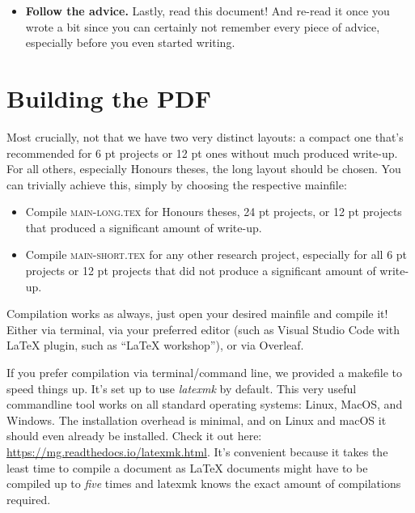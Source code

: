 \begin{itemize}
\begin{itemize}
  \end{itemize}
  Note that in principle, you can even discard this template altogether and choose a standard conference layout, such as those provided by AAAI (google AAAI authorkit) or the ACM (again, google ACM authorkit). This is however only advised for 6 pt projects, and checked with your supervisor. Even if you do switch, follow the next point, i.e., read this template and follow its advice!
  \item \textbf{Follow the advice.} Lastly, read this document! And re-read it once you wrote a bit since you can certainly not remember every piece of advice, especially before you even started writing.
\end{itemize}



\section{Building the PDF}

Most crucially, not that we have two very distinct layouts: a compact one that's recommended for 6 pt projects or 12 pt ones without much produced write-up. For all others, especially Honours theses, the long layout should be chosen. You can trivially achieve this, simply by choosing the respective mainfile:
\begin{itemize}
  \item Compile \textsc{main-long.tex} for Honours theses, 24 pt projects, or 12 pt projects that produced a significant amount of write-up.
  \item Compile \textsc{main-short.tex} for any other research project, especially for all 6 pt projects or 12 pt projects that did not produce a significant amount of write-up.
\end{itemize}

Compilation works as always, just open your desired mainfile and compile it! Either via terminal, via your preferred editor (such as Visual Studio Code with \LaTeX{} plugin, such as ``LaTeX workshop''), or via Overleaf.

If you prefer compilation via terminal/command line, we provided a makefile to speed things up. It's set up to use \emph{latexmk} by default. This very useful commandline tool works on all standard operating systems: Linux, MacOS, and Windows. The installation overhead is minimal, and on Linux and macOS it should even already be installed. Check it out here: \url{https://mg.readthedocs.io/latexmk.html}. It's convenient because it takes the least time to compile a document as \LaTeX{} documents might have to be compiled up to \emph{five} times and latexmk knows the exact amount of compilations required.

